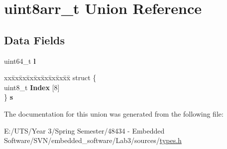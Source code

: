 \hypertarget{unionuint8arr__t}{}\section{uint8arr\+\_\+t Union Reference}
\label{unionuint8arr__t}
\subsection*{Data Fields}
\begin{DoxyCompactItemize}
\item 
\hypertarget{unionuint8arr__t_a9e64f81af8bd86b7e5a52f5bc8640ebe}{}uint64\+\_\+t {\bfseries l}\label{unionuint8arr__t_a9e64f81af8bd86b7e5a52f5bc8640ebe}

\item 
\hypertarget{unionuint8arr__t_aa0683a233f5de164927e46eff7af8412}{}\begin{tabbing}
xx\=xx\=xx\=xx\=xx\=xx\=xx\=xx\=xx\=\kill
struct \{\\
\>uint8\_t {\bfseries Index} \mbox{[}8\mbox{]}\\
\} {\bfseries s}\label{unionuint8arr__t_aa0683a233f5de164927e46eff7af8412}
\\

\end{tabbing}\end{DoxyCompactItemize}


The documentation for this union was generated from the following file\+:\begin{DoxyCompactItemize}
\item 
E\+:/\+U\+T\+S/\+Year 3/\+Spring Semester/48434 -\/ Embedded Software/\+S\+V\+N/embedded\+\_\+software/\+Lab3/sources/\hyperlink{types_8h}{types.\+h}\end{DoxyCompactItemize}
